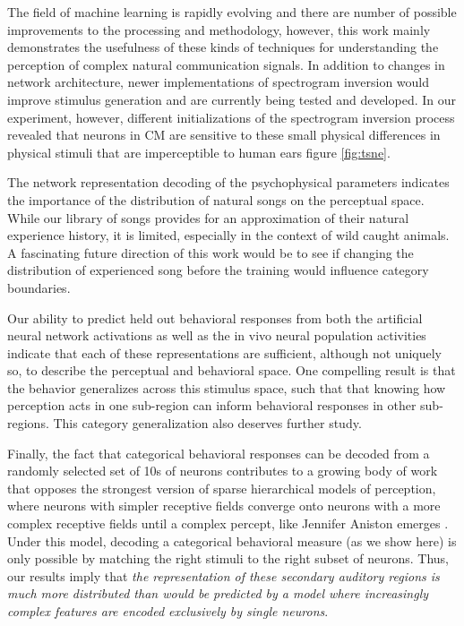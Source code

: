 The field of machine learning is rapidly evolving and there are number of possible improvements to the processing and methodology, however, this work mainly demonstrates the usefulness of these kinds of techniques for understanding the perception of complex natural communication signals. In addition to changes in network architecture, newer implementations of spectrogram inversion would improve stimulus generation and are currently being tested and developed. In our experiment, however, different initializations of the spectrogram inversion process revealed that neurons in \ac{CM} are sensitive to these small physical differences in physical stimuli that are imperceptible to human ears figure \ref{fig:tsne}.

The network representation decoding of the psychophysical parameters indicates the importance of the distribution of natural songs on the perceptual space. While our library of songs provides for an approximation of their natural experience history, it is limited, especially in the context of wild caught animals. A fascinating future direction of this work would be to see if changing the distribution of experienced song before the training would influence category boundaries.

Our ability to predict held out behavioral responses from both the artificial neural network activations as well as the in vivo neural population activities indicate that each of these representations are sufficient, although not uniquely so, to describe the perceptual and behavioral space. One compelling result is that the behavior generalizes across this stimulus space, such that that knowing how perception acts in one sub-region can inform behavioral responses in other sub-regions. This category generalization also deserves further study.

Finally, the fact that categorical behavioral responses can be decoded from a randomly selected set of 10s of neurons contributes to a growing body of work \cite{jeanne2011emergence,kozlov2016central} that opposes the strongest version of sparse hierarchical models of perception, where neurons with simpler receptive fields converge onto neurons with a more complex receptive fields until a complex percept, like Jennifer Aniston emerges \cite{quiroga2005invariant}. Under this model, decoding a categorical behavioral measure (as we show here) is only possible by matching the right stimuli to the right subset of neurons. Thus, our results imply that \emph{the representation of these secondary auditory regions is much more distributed than would be predicted by a model where increasingly complex features are encoded exclusively by single neurons}.

